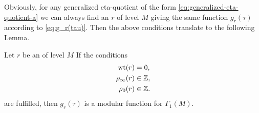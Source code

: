 \documentclass{article}
\begin{document}
Obviously, for any generalized eta-quotient of the form
\eqref{eq:generalized-eta-quotient-a} we can always find an
 $r$ of level $M$ giving the same function
$g_r(\tau)$ according to \eqref{eq:g_r(tau)}. Then the above
conditions translate to the following Lemma.

\begin{Lemma}
  \label{thm:modular-eta-quotient-gamma1}
  Let $r$ be an  of level $M$ If the
  conditions
  \begin{align}
    \operatorname{wt}(r) &= 0,  \label{eq:generalized-weight}\\
    \rho_\infty(r) &\in \mathbb{Z}, \label{eq:rhoinfinity}\\
    \rho_0(r) &\in \mathbb{Z}. \label{eq:rho0}
  \end{align}
  are fulfilled, then $g_r(\tau)$ is a modular function for
  $\Gamma_1(M)$.
\end{Lemma}
\end{document}
